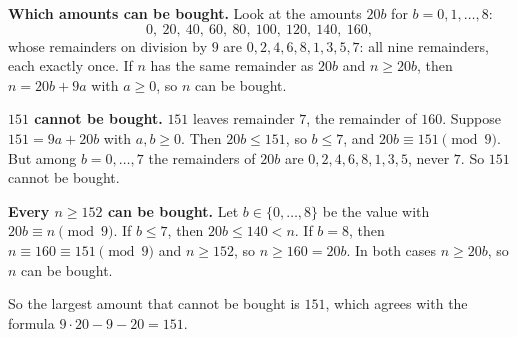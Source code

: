 \textbf{Which amounts can be bought.} Look at the amounts $20b$ for $b=0,1,\dots,8$:
\[
0,\ 20,\ 40,\ 60,\ 80,\ 100,\ 120,\ 140,\ 160,
\]
whose remainders on division by $9$ are $0,2,4,6,8,1,3,5,7$: all nine remainders, each exactly once. If $n$ has the same remainder as $20b$ and $n\ge20b$, then $n=20b+9a$ with $a\ge0$, so $n$ can be bought.

\textbf{$151$ cannot be bought.} $151$ leaves remainder $7$, the remainder of $160$. Suppose $151=9a+20b$ with $a,b\ge0$. Then $20b\le151$, so $b\le7$, and $20b\equiv151\pmod9$. But among $b=0,\dots,7$ the remainders of $20b$ are $0,2,4,6,8,1,3,5$, never $7$. So $151$ cannot be bought.

\textbf{Every $n\ge152$ can be bought.} Let $b\in\{0,\dots,8\}$ be the value with $20b\equiv n\pmod9$. If $b\le7$, then $20b\le140<n$. If $b=8$, then $n\equiv160\equiv151\pmod9$ and $n\ge152$, so $n\ge160=20b$. In both cases $n\ge20b$, so $n$ can be bought.

So the largest amount that cannot be bought is $\boxed{151}$, which agrees with the formula $9\cdot20-9-20=151$.
